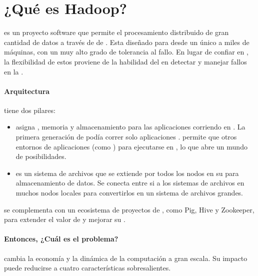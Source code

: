 \chapter{¿Qué es Hadoop? \cite{online_hadoop_description}}\label{ap:apendice_hadoop_description}
\apacheNAME \hadoopNAME es un proyecto software \openSourcePC que permite el procesamiento distribuido de gran cantidad de datos a través de \clustersAS de \serversAS. Esta diseñado para \scaleUpQA desde un único \serverAS a miles de máquinas, con un muy alto grado de tolerancia al fallo. En lugar de confiar en \highEndCPT \hardwarePC, la flexibilidad de estos \clustersAS proviene de la habilidad del \softwarePC en detectar y manejar fallos en la \applayer.

\subsubsection*{Arquitectura \highLevelCPT} 
\apacheNAME \hadoopNAME tiene dos pilares:

\begin{itemize}
	\item \hadoopYarnNAME asigna \cpuPC, memoria y almacenamiento para las aplicaciones corriendo en \clustersAS \hadoopNAME. La primera generación de \hadoopNAME podía correr solo aplicaciones \hadoopMapReduceNAME. \hadoopYarnNAME permite que otros entornos de aplicaciones (como \sparkNAME) para ejecutarse en \hadoopNAME, lo que abre un mundo de posibilidades.
	
	\item \hadoophdfsNAME es un sistema de archivos que se extiende por todos los nodos en su \clusterAS \hadoopNAME para almacenamiento de datos. Se conecta entre si a los sistemas de archivos en muchos nodos locales para convertirlos en un sistema de archivos grandes.
\end{itemize}

\hadoopNAME se complementa con un ecosistema de proyectos de \apacheNAME, como Pig\cite{online_ibm_meaning_pig}, Hive\cite{online_ibm_meaning_hive} y Zookeeper\cite{online_ibm_meaning_zookeeper}, para extender el valor de \hadoopNAME y mejorar su \usabilityQA.


\subsubsection*{Entonces, ¿Cuál es el problema?}

\hadoopNAME cambia la economía y la dinámica de la computación a gran escala. Su impacto puede reducirse a cuatro características sobresalientes.

